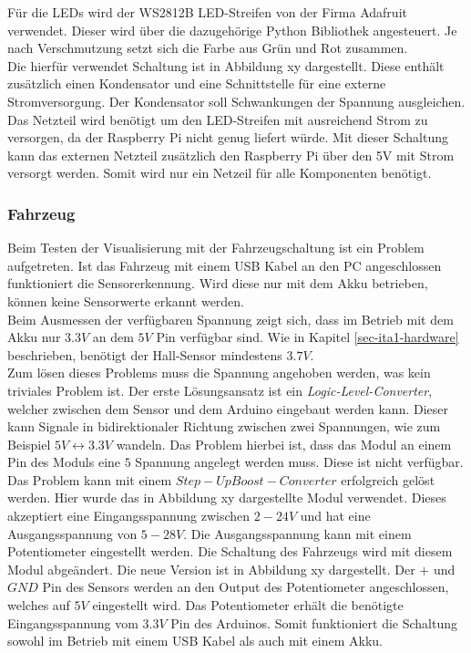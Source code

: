 \documentclass[.../Dokumentation.tex]{subfiles}
\begin{document}
    Für die LEDs wird der WS2812B LED-Streifen von der Firma Adafruit verwendet. Dieser wird über die dazugehörige Python Bibliothek angesteuert. Je nach Verschmutzung setzt sich die Farbe aus Grün und Rot zusammen.\\
    Die hierfür verwendet Schaltung ist in Abbildung xy dargestellt. 
   	Diese enthält zusätzlich einen Kondensator und eine Schnittstelle für eine externe Stromversorgung. Der Kondensator soll Schwankungen der Spannung ausgleichen. Das Netzteil wird benötigt um den LED-Streifen mit ausreichend Strom zu versorgen, da der Raspberry Pi nicht genug liefert würde. Mit dieser Schaltung kann das externen Netzteil zusätzlich den Raspberry Pi über den 5V mit Strom versorgt werden. Somit wird nur ein Netzeil für alle Komponenten  benötigt.
   	
   	\subsubsection*{Fahrzeug}
   	Beim Testen der Visualisierung mit der Fahrzeugschaltung ist ein Problem aufgetreten. Ist das Fahrzeug mit einem USB Kabel an den PC angeschlossen funktioniert die Sensorerkennung. Wird diese nur mit dem Akku betrieben, können keine Sensorwerte erkannt werden.\\
   	Beim Ausmessen der verfügbaren Spannung zeigt sich, dass im Betrieb mit dem Akku nur $3.3V$ an dem $5V$ Pin verfügbar sind. Wie in Kapitel \ref{sec-ita1-hardware} beschrieben, benötigt der Hall-Sensor mindestens $3.7V$.\\
   	Zum lösen dieses Problems muss die Spannung angehoben werden, was kein triviales Problem ist. Der erste Lösungsansatz ist ein \emph{Logic-Level-Converter}, welcher zwischen dem Sensor und dem Arduino eingebaut werden kann. Dieser kann Signale in bidirektionaler Richtung zwischen zwei Spannungen, wie zum Beispiel $5V \longleftrightarrow 3.3V$ wandeln. Das Problem hierbei ist, dass das Modul an einem Pin des Moduls eine $5$ Spannung angelegt werden muss. Diese ist nicht verfügbar.\\
   	Das Problem kann mit einem $Step-Up Boost-Converter$ erfolgreich gelöst werden. Hier wurde das in Abbildung xy dargestellte Modul verwendet.   	%
   	Dieses akzeptiert eine Eingangsspannung zwischen $2-24V$ und hat eine Ausgangsspannung von $5-28V$. Die Ausgangsspannung kann mit einem Potentiometer eingestellt werden. Die Schaltung des Fahrzeugs wird mit diesem Modul abgeändert. Die neue Version ist in Abbildung xy dargestellt. %
   	Der $+$ und $GND$ Pin des Sensors werden an den Output des Potentiometer angeschlossen, welches auf $5V$ eingestellt wird. Das Potentiometer erhält die benötigte Eingangsspannung vom $3.3V$ Pin des Arduinos. Somit funktioniert die Schaltung sowohl im Betrieb mit einem USB Kabel als auch mit einem Akku. 
    
    
\end{document}
